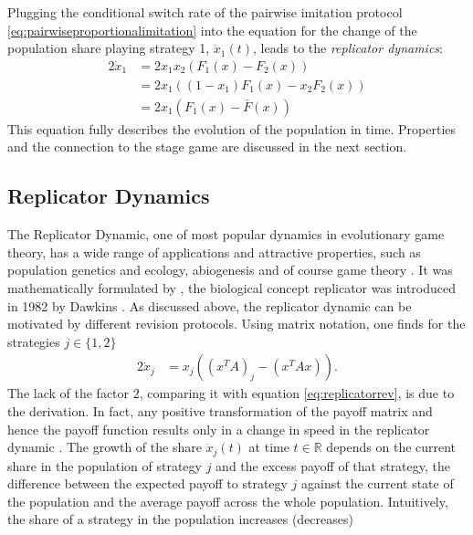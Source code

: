 \documentclass[11pt]{article}
\newcommand{\realnumb}{\mathbb{R}}
\begin{document}
Plugging the conditional switch rate of the pairwise imitation protocol 
\eqref{eq:pairwiseproportionalimitation} into the equation for the change 
of the population share playing strategy 1, $\dot{x}_1(t)$, leads to the 
\textit{replicator dynamics}:
\begin{alignat}{2}
        \label{eq:replicatorrev} 
        \dot{x}_1 &= 2 x_1 x_2 (F_1(x) - F_2(x)) \\
                  &= 2 x_1 ((1-x_1) F_1(x) - x_2 F_2(x)) \\
                  &= 2 x_1 (F_1(x) - \bar{F}(x)) 
\end{alignat}
This equation fully describes the evolution of the population in time.
Properties and the connection to the stage game are discussed in the next
section.

\subsection{Replicator Dynamics}
\label{sec:replicatordynamic}
The Replicator Dynamic, one of most popular dynamics in 
evolutionary game theory, has a wide range of applications and 
attractive properties, such as population genetics and ecology, abiogenesis and
of course game theory \parencite[203]{hofbauer_evolutionary_1998}. 
It was mathematically formulated by \textcite{taylor_evolutionary_1978}, 
the biological concept replicator was introduced in 1982 by Dawkins 
\parencite{dawkins_extended_2016}.
As discussed above, the replicator dynamic can be motivated by different 
revision protocols. Using matrix notation, one finds 
for the strategies $j \in \{1,2\}$
\begin{alignat}{2}
        \dot{x}_j &= x_j\left(\left(x^T A\right)_j -
                \left(x^T A x\right)\right). 
        \label{eq:replicator}
\end{alignat}
The lack of the factor $2$, comparing it with equation 
\eqref{eq:replicatorrev}, is due to the derivation. In fact, any
positive transformation of the payoff matrix and hence the payoff function
results only in a change in speed in the replicator dynamic
\parencite[73]{weibull_evolutionary_1997}.
The growth of the share $\dot{x}_j(t)$ at time $t \in \realnumb$ depends 
on the current share in the population of strategy $j$ and the 
excess payoff of that strategy, the difference between the expected 
payoff to strategy $j$ against the current state of the population and the
average payoff across the whole population.
Intuitively, the share of a strategy in the population increases (decreases) 
\end{document}
